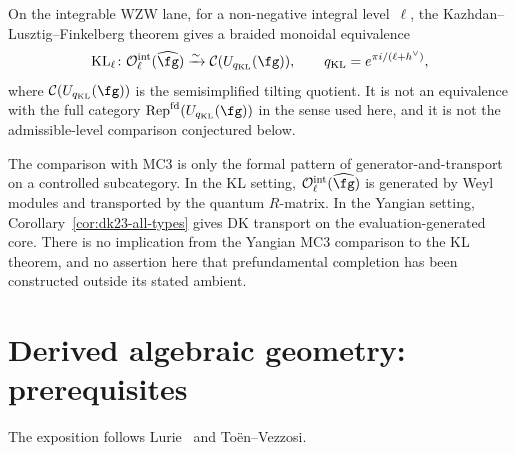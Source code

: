\begin{construction}
\label{constr:kl-categorical-mc3}
\ClaimStatusConditional
{}
On the integrable WZW lane, for a non-negative integral level~$\ell$,
the Kazhdan--Lusztig--Finkelberg theorem gives a braided monoidal
equivalence
\[
\mathrm{KL}_\ell\colon
\mathcal{O}^{\mathrm{int}}_\ell(\widehat{\fg})
\xrightarrow{\sim}
\mathcal C(U_{q_{\mathrm{KL}}}(\fg)),
\qquad q_{\mathrm{KL}}=e^{\pi i/(\ell+h^\vee)},
\]
where $\mathcal C(U_{q_{\mathrm{KL}}}(\fg))$ is the semisimplified
tilting quotient.
It is not an equivalence with the full category
$\mathrm{Rep}^{\mathrm{fd}}(U_{q_{\mathrm{KL}}}(\fg))$ in the sense used here, and it
is not the admissible-level comparison conjectured below.

The comparison with MC3 is only the formal pattern of
generator-and-transport on a controlled subcategory. In the KL setting,
$\mathcal{O}^{\mathrm{int}}_\ell(\widehat{\fg})$ is generated by Weyl
modules and transported by the quantum $R$-matrix. In the Yangian
setting, Corollary~\ref{cor:dk23-all-types} gives DK transport on the
evaluation-generated core. There is no implication from the Yangian MC3
comparison to the KL theorem, and no assertion here that prefundamental
completion has been constructed outside its stated ambient.
\end{construction}

\section{Derived algebraic geometry: prerequisites}
\label{sec:dag-prerequisites}

The exposition follows
Lurie~\cite{HA} and To\"en--Vezzosi.

